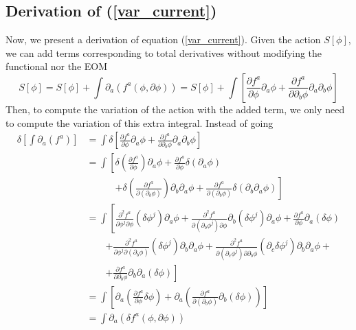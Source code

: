 \documentclass[a4paper,12pt]{article}
\numberwithin{equation}{section}
\numberwithin{thm}{section}
\numberwithin{exm}{section}
\newcommand{\p}{\partial}
\newcommand{\<}{{\langle}}
\renewcommand{\>}{{\rangle}}
\renewcommand{\d}{{\delta}}
\begin{document}
\subsection{Derivation of (\ref{var_current})}
Now, we present a derivation of equation (\ref{var_current}). Given the action $S[\phi]$, we can add terms corresponding to total derivatives without modifying the functional nor the EOM
	\begin{equation}
	S[\phi]=S[\phi]+\int\p_a\left(f^a(\phi,\p\phi)\right)=S[\phi]+\int\left[\frac{\p f^a}{\p\phi}\p_a\phi+\frac{\p f^a}{\p\p_b\phi}\p_a\p_b \phi\right]
	\end{equation}
Then, to compute the variation of the action with the added term, we only need to compute the variation of this extra integral. Instead of going
	\begin{align}
	\d \left[\int\p_a(f^a) \right] & = \int\d\left[\frac{\p f^a}{\p\phi} \p_a\phi + \frac{\p f^a}{\p\p_b\phi} \p_a\p_b \phi\right] \nonumber \\
	& = \int\left[\delta\left(\frac{\p f^a}{\p\phi}\right)\p_a\phi + \frac{\p f^a}{\p\phi}\delta(\p_a\phi)\right. \nonumber \\ 
	& \qquad\quad \left. + \delta\left(\frac{\p f^a}{\p(\p_b\phi)}\right)\p_b\p_a\phi + \frac{\p f^a}{\p(\p_b\phi)}\delta(\p_b\p_a\phi) \right] \nonumber \\
	& = \int\left[ \frac{\p^2 f^a}{\p\phi^j\p\phi}(\d\phi^j)\p_a\phi+\frac{\p^2 f^a}{\p(\p_b\phi^j)\p\phi}\p_b(\d\phi^j)\p_a\phi +\frac{\p f^a}{\p\phi}\p_a(\delta \phi) \right. \nonumber \\
	& \qquad \left.+\frac{\p^2f^a}{\p\phi^j\p(\p_b\phi)}(\d\phi^j)\p_b\p_a\phi+ \frac{\p^2f^a}{\p(\p_c\phi^j)\p\p_b\phi}(\p_c\d\phi^j) \p_b\p_a \phi + \right. \nonumber \\
	& \qquad \left. + \frac{\p f^a}{\p\p_b\phi}\p_b\p_a(\d\phi) \right] \nonumber \\
	& = \int\left[\p_a\left(\frac{\p f^a}{\p\phi}\d\phi\right) + \p_a\left(\frac{\p f^a}{\p(\p_b\phi)} \p_b(\d\phi) \right) \right] \nonumber \\
	& = \int\p_a(\d f^a(\phi,\p\phi))
	\end{align}
\end{document}
